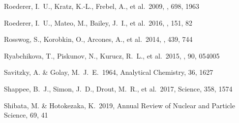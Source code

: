 \documentclass[twocolumn, twocolappendix]{aastex63}
\begin{document}
\begin{thebibliography}{}
 Roederer, I.~U., Kratz, K.-L., Frebel, A., et al.\ 2009, \apj, 698, 1963


 Roederer, I.~U., Mateo, M., Bailey, J.~I., et al.\ 2016, \aj, 151, 82




 Rosswog, S., Korobkin, O., Arcones, A., et al.\ 2014, \mnras, 439, 744






 Ryabchikova, T., Piskunov, N., Kurucz, R.~L., et al.\ 2015, \physscr, 90, 054005




 Savitzky, A. \& Golay, M.~J.~E.\ 1964, Analytical Chemistry, 36, 1627








 Shappee, B.~J., Simon, J.~D., Drout, M.~R., et al.\ 2017, Science, 358, 1574






 Shibata, M. \& Hotokezaka, K.\ 2019, Annual Review of Nuclear and Particle Science, 69, 41



\end{thebibliography}
\end{document}
